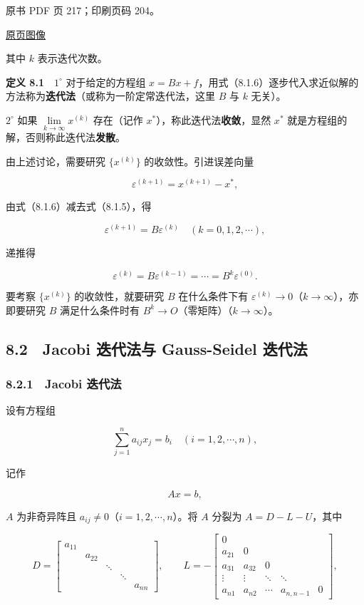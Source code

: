 \clearpage

原书 PDF 页 217；印刷页码 204。

\href{source-images/pdf-217.jpeg}{原页图像}

其中 \(k\) 表示迭代次数。

\textbf{定义 8.1}　\(1^\circ\) 对于给定的方程组 \(x=Bx+f\)，用式（8.1.6）逐步代入求近似解的方法称为\textbf{迭代法}（或称为一阶定常迭代法，这里 \(B\) 与 \(k\) 无关）。

\(2^\circ\) 如果 \(\lim\limits_{k\to\infty}x^{(k)}\) 存在（记作 \(x^*\)），称此迭代法\textbf{收敛}，显然 \(x^*\) 就是方程组的解，否则称此迭代法\textbf{发散}。

由上述讨论，需要研究 \(\{x^{(k)}\}\) 的收敛性。引进误差向量

\[
\varepsilon^{(k+1)}=x^{(k+1)}-x^*,
\]

由式（8.1.6）减去式（8.1.5），得

\[
\varepsilon^{(k+1)}=B\varepsilon^{(k)}\quad(k=0,1,2,\cdots),
\]

递推得

\[
\varepsilon^{(k)}=B\varepsilon^{(k-1)}=\cdots=B^k\varepsilon^{(0)}.
\]

要考察 \(\{x^{(k)}\}\) 的收敛性，就要研究 \(B\) 在什么条件下有 \(\varepsilon^{(k)}\to0\)（\(k\to\infty\)），亦即要研究 \(B\) 满足什么条件时有 \(B^k\to O\)（零矩阵）（\(k\to\infty\)）。

\subsection{8.2　Jacobi 迭代法与 Gauss-Seidel 迭代法}\label{ch08-jacobi-ux8fedux4ee3ux6cd5ux4e0e-gauss-seidel-ux8fedux4ee3ux6cd5}

\subsubsection{8.2.1　Jacobi 迭代法}\label{ch08-jacobi-ux8fedux4ee3ux6cd5}

设有方程组

\[
\sum_{j=1}^n a_{ij}x_j=b_i\quad(i=1,2,\cdots,n),
\]

记作

\[
Ax=b,
\tag{8.2.1}
\]

\(A\) 为非奇异阵且 \(a_{ij}\neq0\)（\(i=1,2,\cdots,n\)）。将 \(A\) 分裂为 \(A=D-L-U\)，其中

\[
D=\begin{bmatrix}
a_{11}&&&&\\
&a_{22}&&&\\
&&\ddots&&\\
&&&\ddots&\\
&&&&a_{nn}
\end{bmatrix},\qquad
L=-\begin{bmatrix}
0&&&&\\
a_{21}&0&&&\\
a_{31}&a_{32}&0&&\\
\vdots&\vdots&\ddots&\ddots&\\
a_{n1}&a_{n2}&\cdots&a_{n,n-1}&0
\end{bmatrix},
\]

